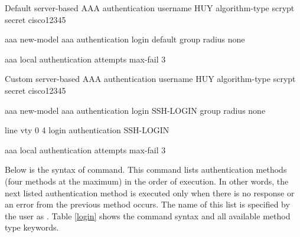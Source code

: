 


\begin{sexylisting}{Default server-based AAA authentication}
username HUY algorithm-type scrypt secret cisco12345

aaa new-model
aaa authentication login default group radius none

aaa local authentication attempts max-fail 3
\end{sexylisting}

\begin{sexylisting}{Custom server-based AAA authentication}
username HUY algorithm-type scrypt secret cisco12345

aaa new-model
aaa authentication login SSH-LOGIN group radius none

line vty 0 4
login authentication SSH-LOGIN

aaa local authentication attempts max-fail 3
\end{sexylisting}


Below is the syntax of  command. This command lists authentication methods (four methods at the maximum) in the order of execution. In other words, the next listed authentication method is executed only when there is no response or an error from the previous method occurs. The name of this list is specified by the user as . Table \ref{login} shows the command syntax and all available method type keywords.

